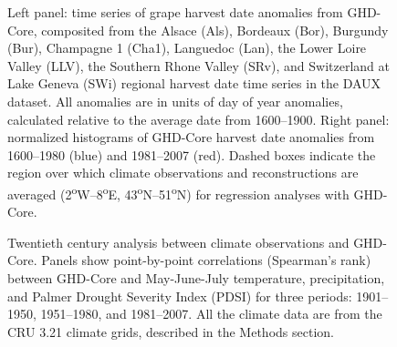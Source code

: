 \documentclass[final]{nature}
\begin{document}

\begin{figure} %
\caption{Left panel: time series of grape harvest date anomalies from GHD-Core, composited from the Alsace (Als), Bordeaux (Bor), Burgundy (Bur), Champagne 1 (Cha1), Languedoc (Lan), the Lower Loire Valley (LLV), the Southern Rhone Valley (SRv), and Switzerland at Lake Geneva (SWi) regional harvest date time series in the DAUX\cite{Daux2012} dataset. All anomalies are in units of day of year anomalies, calculated relative to the average date from 1600--1900. Right panel: normalized histograms of GHD-Core harvest date anomalies from 1600--1980 (blue) and 1981--2007 (red). Dashed boxes indicate the region over which climate observations and reconstructions are averaged (2\textsuperscript{o}W--8\textsuperscript{o}E, 43\textsuperscript{o}N--51\textsuperscript{o}N) for regression analyses with GHD-Core.}
\end{figure}

\begin{figure}
\caption{Twentieth century analysis between climate observations and GHD-Core. Panels show point-by-point correlations (Spearman's rank) between GHD-Core and May-June-July temperature, precipitation, and Palmer Drought Severity Index (PDSI) for three periods: 1901--1950, 1951--1980, and 1981--2007. All the climate data are from the CRU 3.21 climate grids, described in the Methods section.}
\end{figure}
\end{document}
